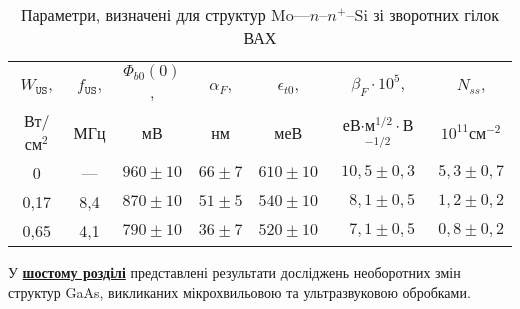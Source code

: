 \begin{table}[hb]
\caption{Параметри, визначені для структур Mo---$n$--$n^+$--Si зі зворотних гілок ВАХ}
\label{tabSDBParZv}
\centering
\begin{tabular}{|c|c|c|c|c|c|c|}
\hline
$W_\mathtt{US}$, &$f_\mathtt{US}$,&$\Phi_{b0}(0)$,&$\alpha_F$,&$\epsilon_{t0}$,&$\beta_F\cdot10^{5}$,&$N_{ss}$,\\
Вт/см$^2$&МГц&мВ&нм&меВ&еВ$\cdot$м$^{1/2}\cdot$В$^{-1/2}$&$10^{11}$см$^{-2}$\\\hline
0&---&$960\pm10$&$66\pm7$&$610\pm10$&$10,5\pm0,3$&$5,3\pm0,7$\\\hline
0,17&8,4&$870\pm10$&$51\pm5$&$540\pm10$&$\;\:8,1\pm0,5$&$1,2\pm0,2$\\\hline
0,65&4,1&$790\pm10$&$36\pm7$&$520\pm10$&$\;\:7,1\pm0,5$&$0,8\pm0,2$\\\hline
\end{tabular}
\end{table}

У  \underline{\textbf{шостому розділі}} представлені результати досліджень необоротних змін 
структур GaAs, викликаних мікрохвильовою та ультразвуковою обробками.

